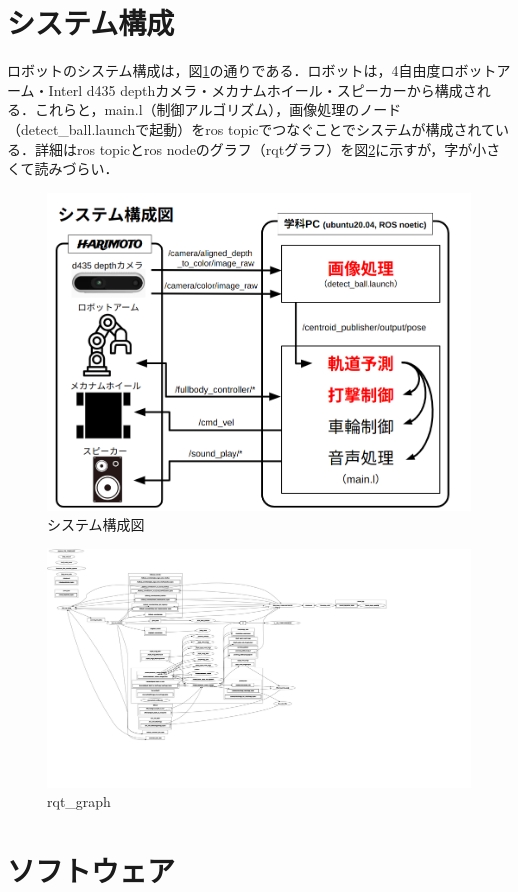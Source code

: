 \documentclass[10pt, oneside, titlepage]{ltjsarticle}  %
\begin{document}
\section{システム構成}
ロボットのシステム構成は，図\ref{system}の通りである．ロボットは，4自由度ロボットアーム・Interl d435 depthカメラ・メカナムホイール・スピーカーから構成される．これらと，main.l（制御アルゴリズム），画像処理のノード（detect\_ball.launchで起動）をros topicでつなぐことでシステムが構成されている．詳細はros topicとros nodeのグラフ（rqtグラフ）を図\ref{rqt}に示すが，字が小さくて読みづらい．
\begin{figure}[H]
\centering
\includegraphics[width=12cm]{figures/system.png}
\caption{システム構成図}
\label{system}
\end{figure}
\begin{figure}[H]
\centering
\includegraphics[width=15cm]{figures/rosgraph.png}
\caption{rqt\_graph}
\label{rqt}
\end{figure}
\section{ソフトウェア}
\end{document}
